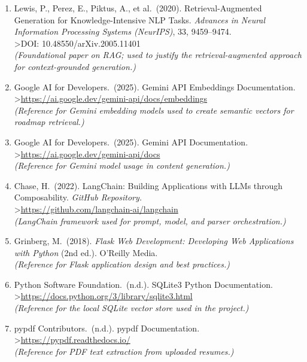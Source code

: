 \documentclass[12pt,a4paper]{report}
\begin{document}
\begin{enumerate}

\item Lewis, P., Perez, E., Piktus, A., et al.\ (2020). Retrieval-Augmented
Generation for Knowledge-Intensive NLP Tasks. \textit{Advances in Neural
Information Processing Systems (NeurIPS)}, 33, 9459--9474.\\
\textgreater\space DOI: 10.48550/arXiv.2005.11401\\
\textit{(Foundational paper on RAG; used to justify the retrieval-augmented
approach for context-grounded generation.)}

\item Google AI for Developers.\ (2025). Gemini API Embeddings Documentation.\\
\textgreater\space \url{https://ai.google.dev/gemini-api/docs/embeddings}\\
\textit{(Reference for Gemini embedding models used to create semantic vectors
for roadmap retrieval.)}

\item Google AI for Developers.\ (2025). Gemini API Documentation.\\
\textgreater\space \url{https://ai.google.dev/gemini-api/docs}\\
\textit{(Reference for Gemini model usage in content generation.)}

\item Chase, H.\ (2022). LangChain: Building Applications with LLMs through
Composability. \textit{GitHub Repository.}\\
\textgreater\space \url{https://github.com/langchain-ai/langchain}\\
\textit{(LangChain framework used for prompt, model, and parser orchestration.)}

\item Grinberg, M.\ (2018). \textit{Flask Web Development: Developing Web
Applications with Python} (2nd ed.). O'Reilly Media.\\
\textit{(Reference for Flask application design and best practices.)}

\item Python Software Foundation.\ (n.d.). SQLite3 Python Documentation.\\
\textgreater\space \url{https://docs.python.org/3/library/sqlite3.html}\\
\textit{(Reference for the local SQLite vector store used in the project.)}

\item pypdf Contributors.\ (n.d.). pypdf Documentation.\\
\textgreater\space \url{https://pypdf.readthedocs.io/}\\
\textit{(Reference for PDF text extraction from uploaded resumes.)}

\end{enumerate}
\end{document}
